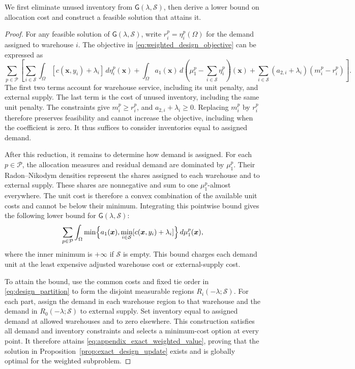 \documentclass[a4paper,fleqn]{cas-sc}
\theoremstyle{remark}
\theoremstyle{plain}
\begin{document}
We first eliminate unused inventory from $\mathsf G(\lambda,\mathcal S)$, then derive a lower bound on allocation cost and construct a feasible solution that attains it.
\begin{proof}
For any feasible solution of $\mathsf G(\lambda,\mathcal S)$, write $r_i^p=\eta_i^p(\Omega)$ for the demand assigned to warehouse $i$. The objective in \eqref{eq:weighted_design_objective} can be expressed as
\[
    \sum_{p\in\mathcal P}\left[\sum_{i\in\mathcal S}\int_\Omega[c(\bm x,y_i)+\lambda_i]\,d\eta_i^p(\bm x)+\int_\Omega a_1(\bm x)\,d\!\left(\mu_1^p-\sum_{i\in\mathcal S}\eta_i^p\right)(\bm x)+\sum_{i\in\mathcal S}(a_{2,i}+\lambda_i)(m_i^p-r_i^p)\right].
\]
The first two terms account for warehouse service, including its unit penalty, and external supply. The last term is the cost of unused inventory, including the same unit penalty. The constraints give $m_i^p\ge r_i^p$, and $a_{2,i}+\lambda_i\ge0$. Replacing $m_i^p$ by $r_i^p$ therefore preserves feasibility and cannot increase the objective, including when the coefficient is zero. It thus suffices to consider inventories equal to assigned demand.

After this reduction, it remains to determine how demand is assigned. For each $p\in\mathcal P$, the allocation measures and residual demand are dominated by $\mu_1^p$. Their Radon--Nikodym densities represent the shares assigned to each warehouse and to external supply. These shares are nonnegative and sum to one $\mu_1^p$-almost everywhere. The unit cost is therefore a convex combination of the available unit costs and cannot be below their minimum. Integrating this pointwise bound gives the following lower bound for $\mathsf G(\lambda,\mathcal S)$:
\begin{equation}
    \sum_{p\in\mathcal P}\int_\Omega\min\Bigl\{a_1(\bm x),\min_{i\in\mathcal S}[c(\bm x,y_i)+\lambda_i]\Bigr\}\,d\mu_1^p(\bm x),
    \label{eq:appendix_exact_weighted_value}
\end{equation}
where the inner minimum is $+\infty$ if $\mathcal S$ is empty. This bound charges each demand unit at the least expensive adjusted warehouse cost or external-supply cost.

To attain the bound, use the common costs and fixed tie order in \eqref{eq:design_partition} to form the disjoint measurable regions $R_i(-\lambda;\mathcal S)$. For each part, assign the demand in each warehouse region to that warehouse and the demand in $R_0(-\lambda;\mathcal S)$ to external supply. Set inventory equal to assigned demand at allowed warehouses and to zero elsewhere. This construction satisfies all demand and inventory constraints and selects a minimum-cost option at every point. It therefore attains \eqref{eq:appendix_exact_weighted_value}, proving that the solution in Proposition~\ref{prop:exact_design_update} exists and is globally optimal for the weighted subproblem.


\end{proof}
\end{document}
